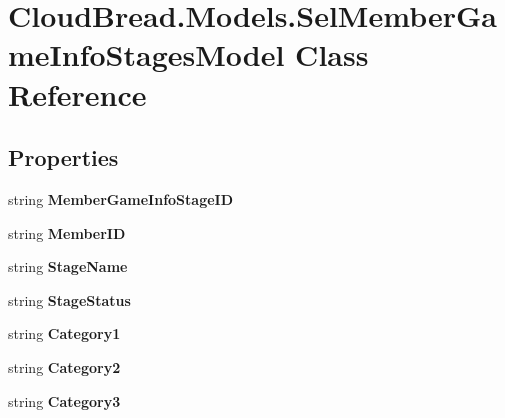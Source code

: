 \hypertarget{a00099}{}\section{Cloud\+Bread.\+Models.\+Sel\+Member\+Game\+Info\+Stages\+Model Class Reference}
\label{a00099}
\subsection*{Properties}
\begin{DoxyCompactItemize}
\item 
string {\bfseries Member\+Game\+Info\+Stage\+ID}\hypertarget{a00099_a357564a17146fcd19feed3a945a13245}{}\label{a00099_a357564a17146fcd19feed3a945a13245}

\item 
string {\bfseries Member\+ID}\hypertarget{a00099_a7bcad9a1567d790c205ac3e2cc4e4d66}{}\label{a00099_a7bcad9a1567d790c205ac3e2cc4e4d66}

\item 
string {\bfseries Stage\+Name}\hypertarget{a00099_a1df6161ef7845669ab4cf9e6ae82bc22}{}\label{a00099_a1df6161ef7845669ab4cf9e6ae82bc22}

\item 
string {\bfseries Stage\+Status}\hypertarget{a00099_aa1924dc0db231c573e810df7305a3d4b}{}\label{a00099_aa1924dc0db231c573e810df7305a3d4b}

\item 
string {\bfseries Category1}\hypertarget{a00099_a42065d22562a0d6780b0dd425e3b57eb}{}\label{a00099_a42065d22562a0d6780b0dd425e3b57eb}

\item 
string {\bfseries Category2}\hypertarget{a00099_a6b81b1af4cae015064417579a9f822ee}{}\label{a00099_a6b81b1af4cae015064417579a9f822ee}

\item 
string {\bfseries Category3}\hypertarget{a00099_ac86312401a46bcc8a1fa4d57771daa5b}{}\label{a00099_ac86312401a46bcc8a1fa4d57771daa5b}


\end{DoxyCompactItemize}
